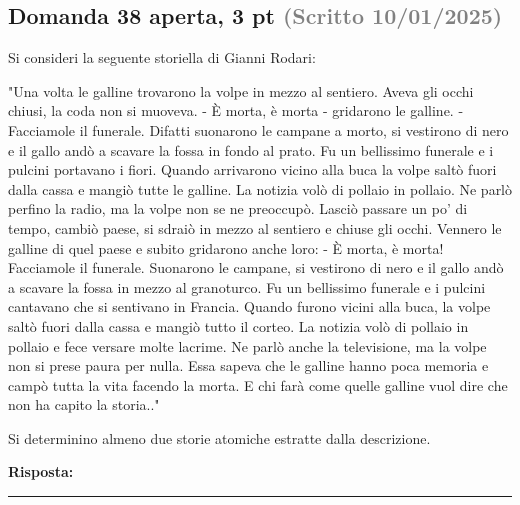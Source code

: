 \documentclass[a4paper,11pt]{article}
\begin{document}
\subsection*{Domanda 38 \hfill {\small aperta, 3 pt \textcolor{gray}{(Scritto 10/01/2025)}}}
\begin{tcolorbox}[colback=gray!8,colframe=gray!50,title=Contesto]
Si consideri la seguente storiella di Gianni Rodari:

"Una volta le galline trovarono la volpe in mezzo al sentiero. Aveva gli occhi chiusi, la coda non si muoveva. - È morta, è morta - gridarono le galline. - Facciamole il funerale. Difatti suonarono le campane a morto, si vestirono di nero e il gallo andò a scavare la fossa in fondo al prato. Fu un bellissimo funerale e i pulcini portavano i fiori. Quando arrivarono vicino alla buca la volpe saltò fuori dalla cassa e mangiò tutte le galline.
La notizia volò di pollaio in pollaio. Ne parlò perfino la radio, ma la volpe non se ne preoccupò. Lasciò passare un po' di tempo, cambiò paese, si sdraiò in mezzo al sentiero e chiuse gli occhi. Vennero le galline di quel paese e subito gridarono anche loro: - È morta, è morta! Facciamole il funerale.
Suonarono le campane, si vestirono di nero e il gallo andò a scavare la fossa in mezzo al granoturco. Fu un bellissimo funerale e i pulcini cantavano che si sentivano in Francia. Quando furono vicini alla buca, la volpe saltò fuori dalla cassa e mangiò tutto il corteo.
La notizia volò di pollaio in pollaio e fece versare molte lacrime. Ne parlò anche la televisione, ma la volpe non si prese paura per nulla. Essa sapeva che le galline hanno poca memoria e campò tutta la vita facendo la morta. E chi farà come quelle galline vuol dire che non ha capito la storia.."
\end{tcolorbox}
Si determinino almeno due storie atomiche estratte dalla descrizione.

\vspace{0.2cm}
\noindent\textbf{Risposta:}\par
\vspace{4cm}\hrule


\end{document}

